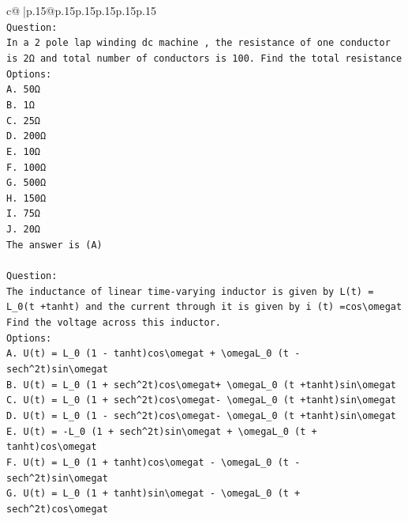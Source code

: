 \documentclass{article}
\begin{document}
{\begin{supertabular}{c@{$\;$}|p{.15\linewidth}@{}p{.15\linewidth}p{.15\linewidth}p{.15\linewidth}p{.15\linewidth}p{.15\linewidth}}
{{{\\ 
\texttt{Question:} \\
\texttt{In a 2 pole lap winding dc machine , the resistance of one conductor is 2Ω and total number of conductors is 100. Find the total resistance} \\
\texttt{Options:} \\
\texttt{A. 50Ω} \\
\texttt{B. 1Ω} \\
\texttt{C. 25Ω} \\
\texttt{D. 200Ω} \\
\texttt{E. 10Ω} \\
\texttt{F. 100Ω} \\
\texttt{G. 500Ω} \\
\texttt{H. 150Ω} \\
\texttt{I. 75Ω} \\
\texttt{J. 20Ω} \\
\texttt{The answer is (A)} \\
\\ 
\texttt{Question:} \\
\texttt{The inductance of linear time{-}varying inductor is given by L(t) = L\_0(t +tanht) and the current through it is given by i (t) =cos\textbackslash{}omegat Find the voltage across this inductor.} \\
\texttt{Options:} \\
\texttt{A. U(t) = L\_0 (1 {-} tanht)cos\textbackslash{}omegat + \textbackslash{}omegaL\_0 (t {-} sech\^{}2t)sin\textbackslash{}omegat} \\
\texttt{B. U(t) = L\_0 (1 + sech\^{}2t)cos\textbackslash{}omegat+ \textbackslash{}omegaL\_0 (t +tanht)sin\textbackslash{}omegat} \\
\texttt{C. U(t) = L\_0 (1 + sech\^{}2t)cos\textbackslash{}omegat{-} \textbackslash{}omegaL\_0 (t +tanht)sin\textbackslash{}omegat} \\
\texttt{D. U(t) = L\_0 (1 {-} sech\^{}2t)cos\textbackslash{}omegat{-} \textbackslash{}omegaL\_0 (t +tanht)sin\textbackslash{}omegat} \\
\texttt{E. U(t) = {-}L\_0 (1 + sech\^{}2t)sin\textbackslash{}omegat + \textbackslash{}omegaL\_0 (t + tanht)cos\textbackslash{}omegat} \\
\texttt{F. U(t) = L\_0 (1 + tanht)cos\textbackslash{}omegat {-} \textbackslash{}omegaL\_0 (t {-} sech\^{}2t)sin\textbackslash{}omegat} \\
\texttt{G. U(t) = L\_0 (1 + tanht)sin\textbackslash{}omegat {-} \textbackslash{}omegaL\_0 (t + sech\^{}2t)cos\textbackslash{}omegat} \\
}}}
\end{supertabular}}
\end{document}
